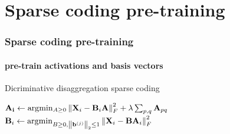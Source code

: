 \documentclass[gray]{beamer}
\begin{document}
\section{Sparse coding pre-training}
\begin{frame}
\frametitle{Sparse coding pre-training}
\framesubtitle{pre-train activations and basis vectors}
\begin{algorithm}[H]
\caption{Dicriminative disaggregation sparse coding}
\label{alg:DDSC}
\begin{algorithmic}[1]
\Statex \hspace{0.4in} $\mathbf{A_i} \leftarrow \arg \! \min_{A \geq 0} \left\lVert\mathbf{X}_i - \mathbf{B}_i\mathbf{A}\right\rVert_F^2 + \lambda \sum_{p,q} \mathbf{A}_{pq}$
\Statex \hspace{0.4in} $\mathbf{B}_i \leftarrow  \arg \! \min_{B \geq 0,\left\lVert\mathbf{b}^{(j)}\right\rVert_2 \leq 1} \left\lVert\mathbf{X}_i - \mathbf{B} \mathbf{A}_i \right\rVert_F^2$
\end{algorithmic}
\end{algorithm}
\end{frame}
\end{document}
